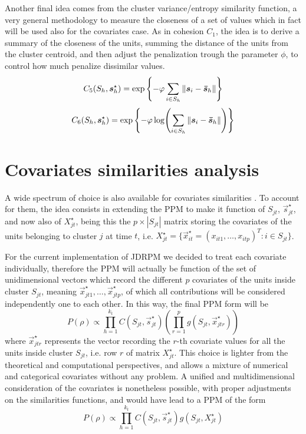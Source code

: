 \documentclass[12pt,	%
	a4paper,		%
	twoside,		%
	openright,		%
	titlepage,%
	]{book}
\theoremstyle{definition}
\begin{document}
Another final idea comes from the cluster variance/entropy similarity function, a very general methodology to measure the closeness of a set of values which in fact will be used also for the covariates case. As in cohesion $C_1$, the idea is to derive a summary of the closeness of the units, summing the distance of the units from the cluster centroid, and then adjust the penalization trough the parameter $\phi$, to control how much penalize dissimilar values. 
\begin{equation}    
C_5(S_{h},\boldsymbol{s}_{h}^\star) = \exp \left\{ -\varphi \sum_{i \in S_h} \| \boldsymbol{s}_i - \boldsymbol{\bar{s}}_h\|  \right\}
\end{equation}
\begin{equation}    
C_6(S_{h},\boldsymbol{s}_{h}^\star) = \exp \left\{ -\varphi \log( \sum_{i \in S_h} \| \boldsymbol{s}_i - \boldsymbol{\bar{s}}_h\| ) \right\}
\end{equation}

\section{Covariates similarities analysis}
\label{Covariates similarity analysis}

A wide spectrum of choice is also available for covariates similarities \cite{paper6}. To account for them, the idea consists in extending the PPM to make it function of $S_{jt}$, $\vec{s}_{jt}^\star$, and now also of $X_{jt}^\star$, being this the $p \times |S_{jt}|$ matrix storing the covariates of the units belonging to cluster $j$ at time $t$, i.e. $X_{jt}^\star = \{ \vec{x}_{it}^\star = (x_{it1}, \ldots, x_{itp})^T : i \in S_{jt} \}$.

For the current implementation of JDRPM we decided to treat each covariate individually, therefore the PPM will actually be function of the set of unidimensional vectors which record the different $p$ covariates of the units inside cluster $S_{jt}$, meaning $\vec{x}_{jt1}^\star, \ldots,\vec{x}_{jtp}^\star$, of which all contributions will be considered independently one to each other. In this way, the final PPM form will be
\begin{equation}
P(\rho) \propto \prod_{h=1}^{k_t} C(S_{jt},\vec{s}_{jt}^\star) \left( \prod_{r=1}^p g(S_{jt},\vec{x}_{jtr}^\star) \right)
\end{equation}
where $\vec{x}_{jtr}^\star$ represents the vector recording the $r$-th covariate values for all the units inside cluster $S_{jt}$, i.e. row $r$ of matrix $X_{jt}^\star$. This choice is lighter from the theoretical and computational perspectives, and allows a mixture of numerical and categorical covariates without any problem. A unified and multidimensional consideration of the covariates is nonetheless possible, with proper adjustments on the similarities functions, and would have lead to a PPM of the form
\begin{equation}
P(\rho) \propto \prod_{h=1}^{k_t} C(S_{jt},\vec{s}_{jt}^\star) g(S_{jt},X_{jt}^\star)
\end{equation}
\end{document}

